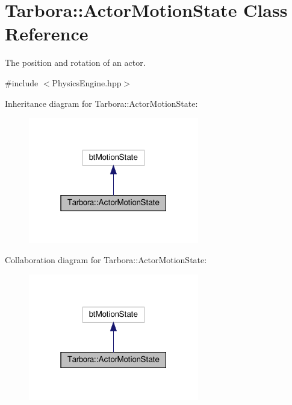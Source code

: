 \hypertarget{classTarbora_1_1ActorMotionState}{}\section{Tarbora\+:\+:Actor\+Motion\+State Class Reference}
\label{classTarbora_1_1ActorMotionState}


The position and rotation of an actor.  




{\ttfamily \#include $<$Physics\+Engine.\+hpp$>$}



Inheritance diagram for Tarbora\+:\+:Actor\+Motion\+State\+:
\nopagebreak
\begin{figure}[H]
\begin{center}
\leavevmode
\includegraphics[width=211pt]{classTarbora_1_1ActorMotionState__inherit__graph}
\end{center}
\end{figure}


Collaboration diagram for Tarbora\+:\+:Actor\+Motion\+State\+:
\nopagebreak
\begin{figure}[H]
\begin{center}
\leavevmode
\includegraphics[width=211pt]{classTarbora_1_1ActorMotionState__coll__graph}
\end{center}
\end{figure}
